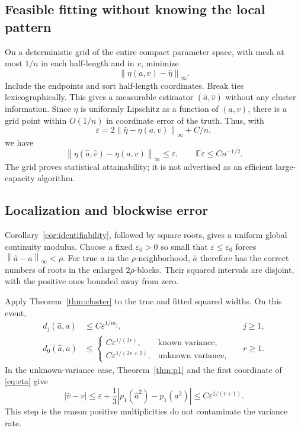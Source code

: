 \documentclass[11pt,a4paper]{article}
\numberwithin{equation}{section}
\theoremstyle{definition}
\theoremstyle{remark}
\newcommand{\E}{\mathbb E}
\newcommand{\norm}[1]{\left\lVert#1\right\rVert}
\begin{document}
\subsection{Feasible fitting without knowing the local pattern}
On a deterministic grid of the entire compact parameter space, with mesh
at most $1/n$ in each half-length and in $v$, minimize
\begin{equation}
 \norm{\eta(a,v)-\widehat\eta}_\infty.
 \label{eq:momentfit}
\end{equation}
Include the endpoints and sort half-length coordinates. Break ties
lexicographically. This gives a measurable estimator
$(\widehat a,\widehat v)$ without any cluster information. Since $\eta$ is
uniformly Lipschitz as a function of $(a,v)$, there is a grid point within
$O(1/n)$ in coordinate error of the truth. Thus, with
\begin{equation}
 \varepsilon=2\norm{\widehat\eta-\eta(a,v)}_\infty+C/n,
\end{equation}
we have
\begin{equation}
 \norm{\eta(\widehat a,\widehat v)-\eta(a,v)}_\infty\le\varepsilon,
 \qquad \E\varepsilon\le Cn^{-1/2}.
 \label{eq:fitresidual}
\end{equation}
The grid proves statistical attainability; it is not advertised as an efficient
large-capacity algorithm.

\subsection{Localization and blockwise error}
Corollary~\ref{cor:identifiability}, followed by square roots, gives a uniform
global continuity modulus. Choose a fixed $\varepsilon_0>0$ so small that
$\varepsilon\le\varepsilon_0$ forces
$\norm{\widehat a-a}_\infty<\rho$. For true $a$ in the $\rho$-neighborhood,
$\widehat a$ therefore has the correct numbers of roots in the enlarged
$2\rho$-blocks. Their squared intervals are disjoint, with the positive ones
bounded away from zero.

Apply Theorem~\ref{thm:cluster} to the true and fitted squared widths. On this
event,
\begin{align}
 d_j(\widehat a,a)&\le C\varepsilon^{1/m_j},&&j\ge1,\\
 d_0(\widehat a,a)&\le
 \begin{cases}
 C\varepsilon^{1/(2r)},&\text{known variance},\\
 C\varepsilon^{1/(2r+2)},&\text{unknown variance},
 \end{cases}&&r\ge1.
 \label{eq:blockerrors}
\end{align}
In the unknown-variance case, Theorem~\ref{thm:p1} and the first coordinate of
\eqref{eq:eta} give
\begin{equation}
 |\widehat v-v|
 \le\varepsilon+\frac13|p_1(\widehat a^2)-p_1(a^2)|
 \le C\varepsilon^{1/(r+1)}.
 \label{eq:varianceerror}
\end{equation}
This step is the reason positive multiplicities do not contaminate the variance
rate.
\end{document}
